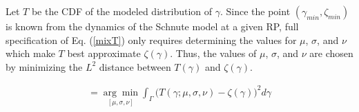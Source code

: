 Let $T$ be the CDF of the modeled distribution of $\gamma$. Since the point
$(\gamma_{min}, \zeta_{min})$ is known from the dynamics of the Schnute model
at a given RP, full specification of Eq. (\ref{mixT}) only requires determining
the values for $\mu$, $\sigma$, and $\nu$ which make $T$ best approximate
$\zeta(\gamma)$. Thus, the values of $\mu$, $\sigma$, and $\nu$ are chosen by
minimizing the $L^2$ distance between $T(\gamma)$ and $\zeta(\gamma)$.

\begin{align}
[\hat\mu, \hat\sigma, \hat\nu]=\underset{{[\mu, \sigma, \nu]}}{\arg\min}\int_\Gamma \big(T(\gamma; \mu, \sigma, \nu) - \zeta(\gamma)\big)^2 d\gamma
\end{align}


